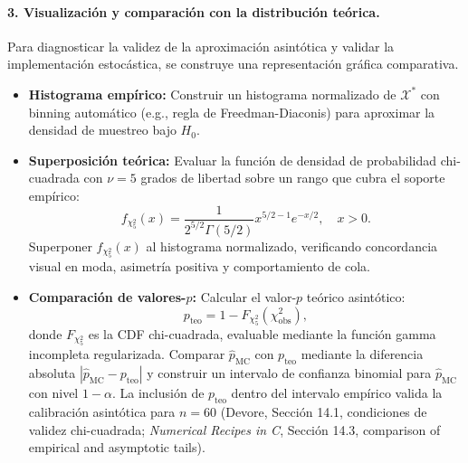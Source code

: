 \documentclass[12pt]{article}
\begin{document}
\paragraph{3. Visualización y comparación con la distribución teórica.}
Para diagnosticar la validez de la aproximación asintótica y validar la implementación estocástica, se construye una representación gráfica comparativa.
\begin{itemize}
    \item \textbf{Histograma empírico:} Construir un histograma normalizado de $\mathcal{X}^*$ con binning automático (e.g., regla de Freedman-Diaconis) para aproximar la densidad de muestreo bajo $H_0$.
    \item \textbf{Superposición teórica:} Evaluar la función de densidad de probabilidad chi-cuadrada con $\nu=5$ grados de libertad sobre un rango que cubra el soporte empírico:
    $$
    f_{\chi^2_5}(x) = \frac{1}{2^{5/2} \Gamma(5/2)} x^{5/2 - 1} e^{-x/2}, \quad x > 0.
    $$
    Superponer $f_{\chi^2_5}(x)$ al histograma normalizado, verificando concordancia visual en moda, asimetría positiva y comportamiento de cola.
    \item \textbf{Comparación de valores-$p$:} Calcular el valor-$p$ teórico asintótico:
    $$
    p_{\text{teo}} = 1 - F_{\chi^2_5}(\chi^2_{\text{obs}}),
    $$
    donde $F_{\chi^2_5}$ es la CDF chi-cuadrada, evaluable mediante la función gamma incompleta regularizada. Comparar $\hat{p}_{\text{MC}}$ con $p_{\text{teo}}$ mediante la diferencia absoluta $|\hat{p}_{\text{MC}} - p_{\text{teo}}|$ y construir un intervalo de confianza binomial para $\hat{p}_{\text{MC}}$ con nivel $1-\alpha$. La inclusión de $p_{\text{teo}}$ dentro del intervalo empírico valida la calibración asintótica para $n=60$ (Devore, Sección 14.1, condiciones de validez chi-cuadrada; \textit{Numerical Recipes in C}, Sección 14.3, comparison of empirical and asymptotic tails).
\end{itemize}
\end{document}
